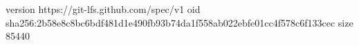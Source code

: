 version https://git-lfs.github.com/spec/v1
oid sha256:2b58e8c8bc6bdf481d1e490fb93b74da1f558ab022ebfe01cc4f578c6f133cec
size 85440

